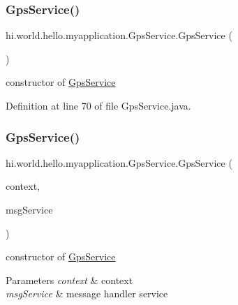 \subsubsection{\texorpdfstring{GpsService()}{GpsService()}\hspace{0.1cm}{\footnotesize\ttfamily [1/2]}}
{\footnotesize\ttfamily hi.\+world.\+hello.\+myapplication.\+Gps\+Service.\+Gps\+Service (\begin{DoxyParamCaption}{ }\end{DoxyParamCaption})}



constructor of \mbox{\hyperlink{classhi_1_1world_1_1hello_1_1myapplication_1_1_gps_service}{Gps\+Service}} 



Definition at line 70 of file Gps\+Service.\+java.


\begin{DoxyCode}{0}

\end{DoxyCode}
\mbox{\label{classhi_1_1world_1_1hello_1_1myapplication_1_1_gps_service_a5a919ba62585c257c1d9610cb81a318f}} 
\subsubsection{\texorpdfstring{GpsService()}{GpsService()}\hspace{0.1cm}{\footnotesize\ttfamily [2/2]}}
{\footnotesize\ttfamily hi.\+world.\+hello.\+myapplication.\+Gps\+Service.\+Gps\+Service (\begin{DoxyParamCaption}\item[{Context}]{context,  }\item[{\mbox{\hyperlink{classhi_1_1world_1_1hello_1_1myapplication_1_1_message_handler}{Message\+Handler}}}]{msg\+Service }\end{DoxyParamCaption})}



constructor of \mbox{\hyperlink{classhi_1_1world_1_1hello_1_1myapplication_1_1_gps_service}{Gps\+Service}} 


\begin{DoxyParams}{Parameters}
{\em context} & context \\
\hline
{\em msg\+Service} & message handler service \\
\hline
\end{DoxyParams}


